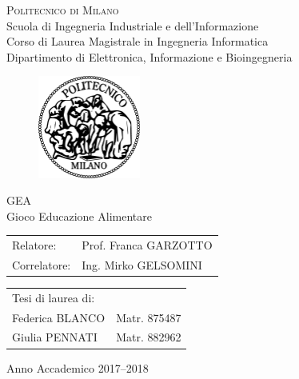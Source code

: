 \begin{titlepage}

\begin{center}
\Large{\textsc{Politecnico di Milano}}\\
\Large{Scuola di Ingegneria Industriale e dell'Informazione}\\
\large{Corso di Laurea Magistrale in Ingegneria Informatica}\\
\large{Dipartimento di Elettronica, Informazione e Bioingegneria}
\par\end{center}

\vspace{0.5cm}

\begin{center}
\begin{figure}[h]
\centering{}\includegraphics[width=0.3\textwidth]{title-page/logo-polimi}
\end{figure}
\vspace{1cm}
\par\end{center}

\begin{center}
\LARGE{GEA\\
Gioco Educazione Alimentare}\vspace{2cm}
\par\end{center}

\begin{flushleft}
\begin{tabular}{ll}
Relatore:  & Prof. Franca GARZOTTO\tabularnewline
Correlatore:  & Ing. Mirko GELSOMINI\tabularnewline
\end{tabular}\vspace{1cm}
\par\end{flushleft}

\begin{flushright}
\begin{tabular}{ll}
Tesi di laurea di: & \tabularnewline
Federica BLANCO & Matr. 875487\tabularnewline
Giulia PENNATI & Matr. 882962\tabularnewline
\end{tabular}\vspace{4cm}
\par\end{flushright}

\begin{center}
{\large{}Anno Accademico 2017--2018}{\large\par}
\par\end{center}

\end{titlepage}
